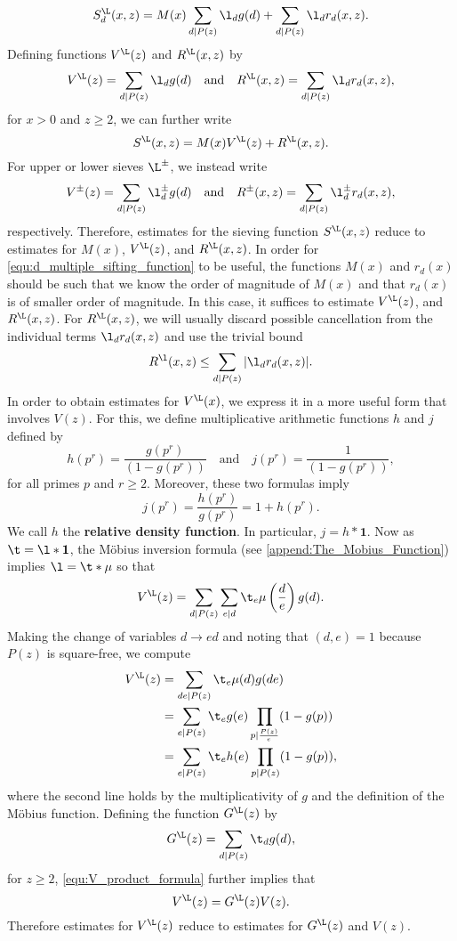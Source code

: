     \[
      S_{d}^{\L}(x,z) = M(x)\sum_{d \mid P(z)}\l_{d}g(d)+\sum_{d \mid P(z)}\l_{d}r_{d}(x,z).
    \]
    Defining functions $V^{\L}(z)$ and $R^{\L}(x,z)$ by
     \[
      V^{\L}(z) = \sum_{d \mid P(z)}\l_{d}g(d) \quad \text{and} \quad R^{\L}(x,z) = \sum_{d \mid P(z)}\l_{d}r_{d}(x,z),
    \]
    for $x > 0$ and $z \ge 2$, we can further write
    \[
      S^{\L}(x,z) = M(x)V^{\L}(z)+R^{\L}(x,z).
    \]
    For upper or lower sieves $\L^{\pm}$, we instead write
     \[
      V^{\pm}(z) = \sum_{d \mid P(z)}\l_{d}^{\pm}g(d) \quad \text{and} \quad R^{\pm}(x,z) = \sum_{d \mid P(z)}\l_{d}^{\pm}r_{d}(x,z),
    \]
    respectively. Therefore, estimates for the sieving function $S^{\L}(x,z)$ reduce to estimates for $M(x)$, $V^{\L}(z)$, and $R^{\L}(x,z)$. In order for \cref{equ:d_multiple_sifting_function} to be useful, the functions $M(x)$ and $r_{d}(x)$ should be such that we know the order of magnitude of $M(x)$ and that $r_{d}(x)$ is of smaller order of magnitude. In this case, it suffices to estimate $V^{\L}(z)$, and $R^{\L}(x,z)$. For $R^{\L}(x,z)$, we will usually discard possible cancellation from the individual terms $\l_{d}r_{d}(x,z)$ and use the trivial bound
    \[
      R^{\l}(x,z) \le \sum_{d \mid P(z)}|\l_{d}r_{d}(x,z)|.
    \]
    In order to obtain estimates for $V^{\L}(x)$, we express it in a more useful form that involves $V(z)$. For this, we define multiplicative arithmetic functions $h$ and $j$ defined by
    \[
      h(p^{r}) = \frac{g(p^{r})}{(1-g(p^{r}))} \quad \text{and} \quad j(p^{r}) = \frac{1}{(1-g(p^{r}))},
    \]
    for all primes $p$ and $r \ge 2$. Moreover, these two formulas imply
    \[
      j(p^{r}) = \frac{h(p^{r})}{g(p^{r})} = 1+h(p^{r}).
    \]
    We call $h$ the \textbf{relative density function}. In particular, $j = h \ast \mathbf{1}$. Now as $\t = \l \ast \mathbf{1}$, the M\"obius inversion formula (see \cref{append:The_Mobius_Function}) implies $\l = \t \ast \mu$ so that
    \[
      V^{\L}(z) = \sum_{d \mid P(z)}\sum_{e \mid d}\t_{e}\mu\left(\frac{d}{e}\right)g(d).
    \]
    Making the change of variables $d \to ed$ and noting that $(d,e) = 1$ because $P(z)$ is square-free, we compute
    \begin{align*}
      V^{\L}(z) &= \sum_{de \mid P(z)}\t_{e}\mu(d)g(de) \\
      &= \sum_{e \mid P(z)}\t_{e}g(e)\prod_{p \mid \frac{P(z)}{e}}(1-g(p)) \\
      &= \sum_{e \mid P(z)}\t_{e}h(e)\prod_{p \mid P(z)}(1-g(p)),
    \end{align*}
    where the second line holds by the multiplicativity of $g$ and the definition of the M\"obius function. Defining the function $G^{\L}(z)$ by
    \[
      G^{\L}(z) = \sum_{d \mid P(z)}\t_{d}g(d),
    \]
    for $z \ge 2$, \cref{equ:V_product_formula} further implies that
    \[
      V^{\L}(z) = G^{\L}(z)V(z).
    \]
    Therefore estimates for $V^{\L}(z)$ reduce to estimates for $G^{\L}(z)$ and $V(z)$.